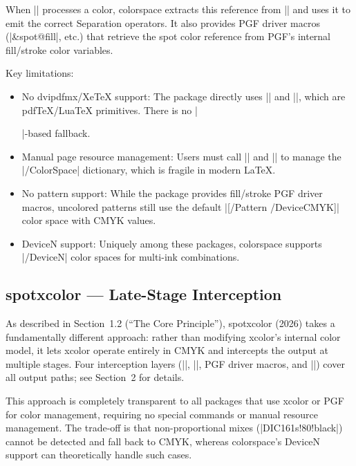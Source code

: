 \documentclass[luatex]{article}
\newcommand\pkg[1]{\textsf{#1}}
\begin{document}
When |\set@color| processes a color, \textsf{colorspace} extracts this reference from |\current@color| and uses it to emit the correct Separation operators.
It also provides PGF driver macros (|\pgfsys@color@&spot@fill|, etc.) that retrieve the spot color reference from PGF's internal fill/stroke color variables.

Key limitations:

\begin{itemize}
\item No dvipdfmx/XeTeX support: The package directly uses |\pdfobj| and |\pdfpageresources|, which are pdfTeX/LuaTeX primitives.
There is no |\special|-based fallback.

\item Manual page resource management: Users must call || and |\resetpagecolorspace| to manage the |/ColorSpace| dictionary, which is fragile in modern \LaTeX.

\item No pattern support: While the package provides fill/stroke PGF driver macros, uncolored patterns still use the default |[/Pattern /DeviceCMYK]| color space with CMYK values.

\item DeviceN support: Uniquely among these packages, \textsf{colorspace} supports |/DeviceN| color spaces for multi-ink combinations.
\end{itemize}

\subsection{\textsf{spotxcolor} --- Late-Stage Interception}

As described in Section~1.2 (``The Core Principle''), \pkg{spotxcolor} (2026) takes a fundamentally different approach: rather than modifying \pkg{xcolor}'s internal color model, it lets \pkg{xcolor} operate entirely in CMYK and intercepts the output at multiple stages.
Four interception layers (|\set@color|, |\set@page@color|, PGF driver macros, and |\pgfsys@setpatternuncolored|) cover all output paths; see Section~2 for details.

This approach is completely transparent to all packages that use \pkg{xcolor} or PGF for color management, requiring no special commands or manual resource management.
The trade-off is that non-proportional mixes (|DIC161s!80!black|) cannot be detected and fall back to CMYK, whereas \textsf{colorspace}'s DeviceN support can theoretically handle such cases.
\end{document}
